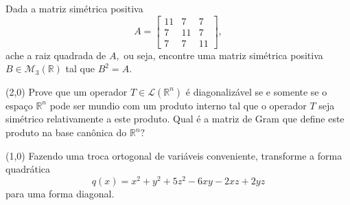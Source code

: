 \documentclass[11pt,a4paper]{article}
\begin{document}
\begin{exercicio}
Dada a matriz simétrica positiva
\[
A = \begin{bmatrix}
11 & 7 & 7 \\
7 & 11 & 7 \\
7 & 7 & 11
\end{bmatrix},
\]
ache a raiz quadrada de $A,$ ou seja, encontre uma matriz simétrica positiva $B \in \mathcal{M}_3(\mathbb{R})$ tal que $B^2 = A.$
\end{exercicio}
\solucao{}
\begin{exercicio}
(2,0) Prove que um operador $T \in \mathcal{L}(\mathbb{R}^n)$ é diagonalizável se e somente se o espaço $\mathbb{R}^n$ pode ser mundio com um produto interno tal que o operador $T$ seja simétrico relativamente a este produto. Qual é a matriz de Gram que define este produto na base canônica do $\mathbb{R}^n?$
\end{exercicio}
\solucao{}
\begin{exercicio}
(1,0) Fazendo uma troca ortogonal de variáveis conveniente, transforme a forma quadrática
\[
q(x) = x^2 + y^2 +5z^2 - 6xy - 2xz + 2yz
\]
para uma forma diagonal.
\end{exercicio}
\solucao{}
 
\end{document}
